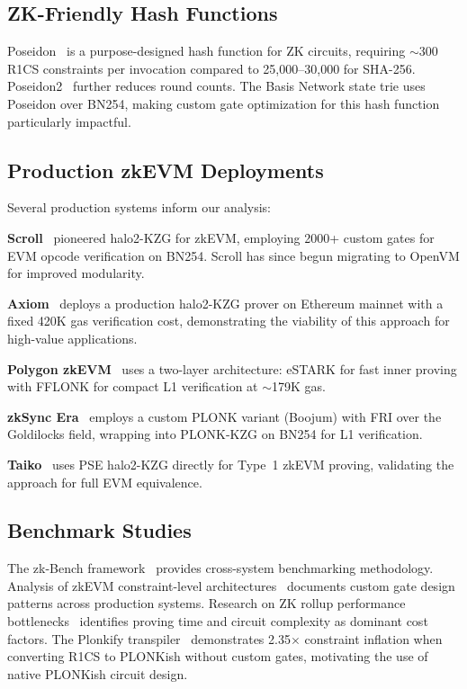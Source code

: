 \subsection{ZK-Friendly Hash Functions}

Poseidon~\cite{poseidon} is a purpose-designed hash function for
ZK circuits, requiring $\sim$300 R1CS constraints per invocation
compared to 25,000--30,000 for SHA-256. Poseidon2~\cite{poseidon2}
further reduces round counts. The Basis Network state trie uses
Poseidon over BN254, making custom gate optimization for this hash
function particularly impactful.

\subsection{Production zkEVM Deployments}

Several production systems inform our analysis:

\textbf{Scroll}~\cite{scroll} pioneered halo2-KZG for zkEVM,
employing 2000+ custom gates for EVM opcode verification on BN254.
Scroll has since begun migrating to OpenVM for improved modularity.

\textbf{Axiom}~\cite{axiom} deploys a production halo2-KZG prover
on Ethereum mainnet with a fixed 420K gas verification cost,
demonstrating the viability of this approach for high-value
applications.

\textbf{Polygon zkEVM}~\cite{polygon-zkevm} uses a two-layer
architecture: eSTARK for fast inner proving with FFLONK for
compact L1 verification at $\sim$179K gas.

\textbf{zkSync Era}~\cite{zksync} employs a custom PLONK variant
(Boojum) with FRI over the Goldilocks field, wrapping into
PLONK-KZG on BN254 for L1 verification.

\textbf{Taiko}~\cite{taiko} uses PSE halo2-KZG directly for
Type~1 zkEVM proving, validating the approach for full EVM
equivalence.

\subsection{Benchmark Studies}

The zk-Bench framework~\cite{zkbench} provides cross-system
benchmarking methodology. Analysis of zkEVM constraint-level
architectures~\cite{zkevm-constraints} documents custom gate
design patterns across production systems. Research on ZK rollup
performance bottlenecks~\cite{zk-bottlenecks} identifies proving
time and circuit complexity as dominant cost factors. The
Plonkify transpiler~\cite{plonkify} demonstrates 2.35$\times$
constraint inflation when converting R1CS to PLONKish without
custom gates, motivating the use of native PLONKish circuit
design.
